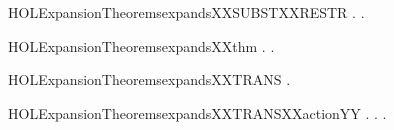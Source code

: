 \begin{SaveVerbatim}{HOLExpansionTheoremsexpandsXXSUBSTXXRESTR}
\HOLTokenTurnstile{} \HOLSymConst{\HOLTokenForall{}} .    \HOLSymConst{\HOLTokenImp{}} \HOLSymConst{\HOLTokenForall{}}. \HOLConst{\ensuremath{\nu}}    \HOLConst{\ensuremath{\nu}}  
\end{SaveVerbatim}
\newcommand{\HOLExpansionTheoremsexpandsXXSUBSTXXRESTR}{\UseVerbatim{HOLExpansionTheoremsexpandsXXSUBSTXXRESTR}}
\begin{SaveVerbatim}{HOLExpansionTheoremsexpandsXXthm}
\HOLTokenTurnstile{} \HOLSymConst{\HOLTokenForall{}} .    \HOLSymConst{\HOLTokenEquiv{}} \HOLSymConst{\HOLTokenExists{}}.    \HOLSymConst{\HOLTokenConj{}}  
\end{SaveVerbatim}
\newcommand{\HOLExpansionTheoremsexpandsXXthm}{\UseVerbatim{HOLExpansionTheoremsexpandsXXthm}}
\begin{SaveVerbatim}{HOLExpansionTheoremsexpandsXXTRANS}
\HOLTokenTurnstile{} \HOLSymConst{\HOLTokenForall{}}  .    \HOLSymConst{\HOLTokenConj{}}    \HOLSymConst{\HOLTokenImp{}}   
\end{SaveVerbatim}
\newcommand{\HOLExpansionTheoremsexpandsXXTRANS}{\UseVerbatim{HOLExpansionTheoremsexpandsXXTRANS}}
\begin{SaveVerbatim}{HOLExpansionTheoremsexpandsXXTRANSXXactionYY}
\HOLTokenTurnstile{} \HOLSymConst{\HOLTokenForall{}} .
          \HOLSymConst{\HOLTokenImp{}}
       \HOLSymConst{\HOLTokenForall{}} .  \HOLTokenTransBegin{}\HOLTokenTransEnd {} \HOLSymConst{\HOLTokenImp{}} \HOLSymConst{\HOLTokenExists{}}.  \HOLTokenWeakTransBegin{}\HOLTokenWeakTransEnd {} \HOLSymConst{\HOLTokenConj{}}   
\end{SaveVerbatim}
